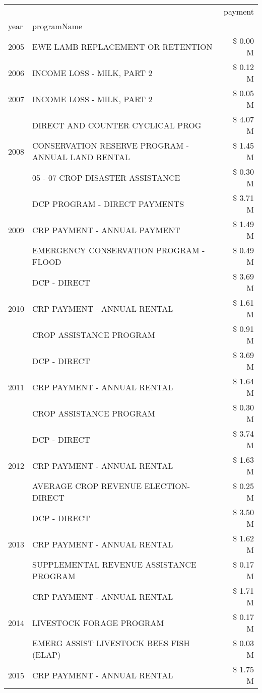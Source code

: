 \begin{tabular}{llr}
\toprule
 &  & payment \\
year & programName &  \\
\midrule
2005 & EWE LAMB REPLACEMENT OR RETENTION & \$ 0.00 M \\
\cline{1-3}
2006 & INCOME LOSS - MILK, PART 2 & \$ 0.12 M \\
\cline{1-3}
2007 & INCOME LOSS - MILK, PART 2 & \$ 0.05 M \\
\cline{1-3}
\multirow[t]{3}{*}{2008} & DIRECT AND COUNTER CYCLICAL PROG & \$ 4.07 M \\
 & CONSERVATION RESERVE PROGRAM - ANNUAL LAND RENTAL & \$ 1.45 M \\
 & 05 - 07 CROP DISASTER ASSISTANCE & \$ 0.30 M \\
\cline{1-3}
\multirow[t]{3}{*}{2009} & DCP PROGRAM - DIRECT PAYMENTS & \$ 3.71 M \\
 & CRP PAYMENT - ANNUAL PAYMENT & \$ 1.49 M \\
 & EMERGENCY CONSERVATION PROGRAM - FLOOD & \$ 0.49 M \\
\cline{1-3}
\multirow[t]{3}{*}{2010} & DCP - DIRECT & \$ 3.69 M \\
 & CRP PAYMENT - ANNUAL RENTAL & \$ 1.61 M \\
 & CROP ASSISTANCE PROGRAM & \$ 0.91 M \\
\cline{1-3}
\multirow[t]{3}{*}{2011} & DCP - DIRECT & \$ 3.69 M \\
 & CRP PAYMENT - ANNUAL RENTAL & \$ 1.64 M \\
 & CROP ASSISTANCE PROGRAM & \$ 0.30 M \\
\cline{1-3}
\multirow[t]{3}{*}{2012} & DCP - DIRECT & \$ 3.74 M \\
 & CRP PAYMENT - ANNUAL RENTAL & \$ 1.63 M \\
 & AVERAGE CROP REVENUE ELECTION-DIRECT & \$ 0.25 M \\
\cline{1-3}
\multirow[t]{3}{*}{2013} & DCP - DIRECT & \$ 3.50 M \\
 & CRP PAYMENT - ANNUAL RENTAL & \$ 1.62 M \\
 & SUPPLEMENTAL REVENUE ASSISTANCE PROGRAM & \$ 0.17 M \\
\cline{1-3}
\multirow[t]{3}{*}{2014} & CRP PAYMENT - ANNUAL RENTAL & \$ 1.71 M \\
 & LIVESTOCK FORAGE PROGRAM & \$ 0.17 M \\
 & EMERG ASSIST LIVESTOCK BEES FISH (ELAP) & \$ 0.03 M \\
\cline{1-3}
\multirow[t]{3}{*}{2015} & CRP PAYMENT - ANNUAL RENTAL & \$ 1.75 M \\

\end{tabular}
